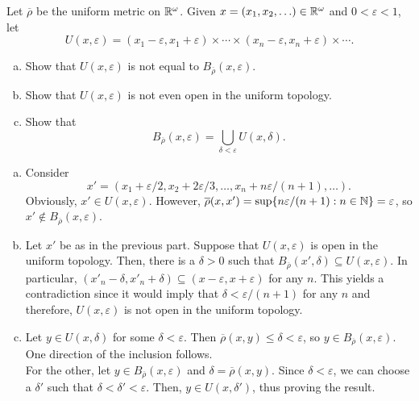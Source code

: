 	\begin{exercise}
		Let $\overline{\rho}$ be the uniform metric on $\mathbb{R}^\omega$. Given $x=(x_1,x_2,\ldots)\in\mathbb{R}^\omega$ and $0<\varepsilon<1$, let
		\[ U(x,\varepsilon) = (x_1-\varepsilon, x_1+\varepsilon) \times \cdots \times (x_n-\varepsilon, x_n+\varepsilon) \times \cdots. \]
		\begin{enumerate}[(a)]
			\item Show that $U(x,\varepsilon)$ is not equal to $B_{\overline{\rho}}(x,\varepsilon)$.
			\item Show that $U(x,\varepsilon)$ is not even open in the uniform topology.
			\item Show that
			\[ B_{\overline{\rho}}(x,\varepsilon) = \bigcup_{\delta < \varepsilon} U(x,\delta). \]
		\end{enumerate}
	\end{exercise}
	\begin{solution*}
		\begin{enumerate}[(a)]
			\item Consider
			\[ x'=(x_1+\varepsilon/2, x_2+2\varepsilon/3, \ldots, x_n+n\varepsilon/(n+1), \ldots). \]
			Obviously, $x'\in U(x,\varepsilon)$. However, $\overline{\rho}(x,x') = \sup\{n\varepsilon/(n+1) : n\in\mathbb{N}\} = \varepsilon$, so $x'\not\in B_{\overline{\rho}}(x,\varepsilon)$.

			\item Let $x'$ be as in the previous part. Suppose that $U(x,\varepsilon)$ is open in the uniform topology. Then, there is a $\delta>0$ such that $B_{\overline{\rho}}(x',\delta)\subseteq U(x,\varepsilon)$. In particular, $(x'_n-\delta,x'_n+\delta)\subseteq (x-\varepsilon,x+\varepsilon)$ for any $n$. This yields a contradiction since it would imply that $\delta < \varepsilon/(n+1)$ for any $n$ and therefore, $U(x,\varepsilon)$ is not open in the uniform topology.

			\item Let $y\in U(x,\delta)$ for some $\delta<\varepsilon$. Then $\overline{\rho}(x,y) \leq \delta < \varepsilon$, so $y\in B_{\overline{\rho}}(x,\varepsilon)$. One direction of the inclusion follows.\\
			For the other, let $y\in B_{\overline{\rho}}(x,\varepsilon)$ and $\delta=\overline{\rho}(x,y)$. Since $\delta<\varepsilon$, we can choose a $\delta'$ such that $\delta<\delta'<\varepsilon$. Then, $y\in U(x,\delta')$, thus proving the result.
		\end{enumerate}
	\end{solution*}	

